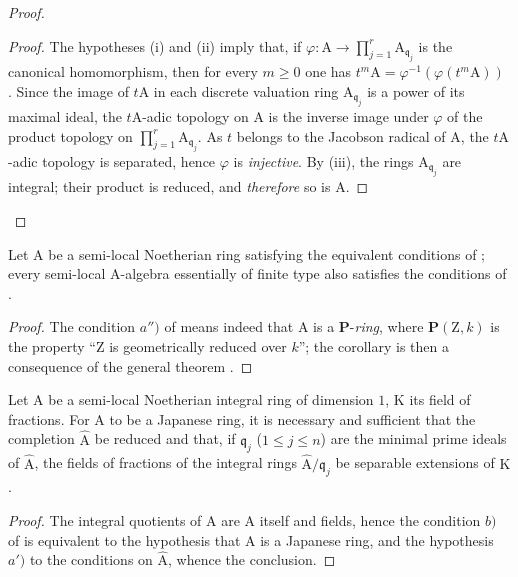 \begin{proof}
\begin{proof}
The hypotheses (i) and (ii) imply that, if $\varphi:\mathrm{A}\to\prod_{j=1}^r\mathrm{A}_{\mathfrak{q}_j}$ is the canonical homomorphism, then for every $m\geqslant 0$ one has $t^m\mathrm{A}=\varphi^{-1}(\varphi(t^m\mathrm{A}))$ . Since the image of $t\mathrm{A}$ in each discrete valuation ring $\mathrm{A}_{\mathfrak{q}_j}$ is a power of its maximal ideal, the $t\mathrm{A}$-adic topology on $\mathrm{A}$ is the inverse image under $\varphi$ of the product topology on $\prod_{j=1}^r\mathrm{A}_{\mathfrak{q}_j}$. As $t$ belongs to the Jacobson radical of $\mathrm{A}$, the $t\mathrm{A}$-adic topology is separated, hence $\varphi$ is \emph{injective}. By (iii), the rings $\mathrm{A}_{\mathfrak{q}_j}$ are integral; their product is reduced, and \emph{therefore} so is $\mathrm{A}$.
\end{proof}
\end{proof}

\begin{corollary}[7.6.5]
\label{IV.7.6.5}
Let $\mathrm{A}$ be a semi-local Noetherian ring satisfying the equivalent conditions of ; every semi-local $\mathrm{A}$-algebra essentially of finite type also satisfies the conditions of .
\end{corollary}

\begin{proof}
The condition $a'')$ of  means indeed that $\mathrm{A}$ is a $\boldsymbol{P}$-\emph{ring}, where $\boldsymbol{P}(\mathrm{Z},k)$ is the property ``$\mathrm{Z}$ is geometrically reduced over $k$''; the corollary is then a consequence of the general theorem .
\end{proof}

\begin{corollary}[7.6.6]
\label{IV.7.6.6}
Let $\mathrm{A}$ be a semi-local Noetherian integral ring of dimension $1$, $\mathrm{K}$ its field of fractions. For $\mathrm{A}$ to be a Japanese ring, it is necessary and sufficient that the completion $\widehat{\mathrm{A}}$
be reduced and that, if $\mathfrak{q}_j$ \textup{(}$1\leqslant j\leqslant n$\textup{)} are the minimal prime ideals of $\widehat{\mathrm{A}}$, the fields of fractions of the integral rings $\widehat{\mathrm{A}}/\mathfrak{q}_j$ be separable extensions of $\mathrm{K}$.
\end{corollary}

\begin{proof}
The integral quotients of $\mathrm{A}$ are $\mathrm{A}$ itself and fields, hence the condition $b)$ of  is equivalent to the hypothesis that $\mathrm{A}$ is a Japanese ring, and the hypothesis $a')$ to the conditions on $\widehat{\mathrm{A}}$, whence the conclusion.
\end{proof}

